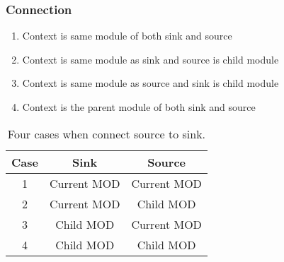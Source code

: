 \begin{frame}
  \frametitle{Connection}

  \begin{enumerate}
    \item Context is same module of both sink and source
    \item Context is same module as sink and source is child module
    \item Context is same module as source and sink is child module
    \item Context is the parent module of both sink and source
  \end{enumerate}

  \begin{table}[h!]
  \footnotesize
  \centering
  \begin{tabular}{||c c c||}
    \hline
      Case & Sink & Source \\
    \hline\hline
      1 & Current MOD & Current MOD \\
      2 & Current MOD & Child   MOD \\
      3 & Child   MOD & Current MOD \\
      4 & Child   MOD & Child   MOD \\
    \hline
  \end{tabular}
  \caption{Four cases when connect source to sink.}
  \label{table:1}
  \end{table}

\end{frame}


